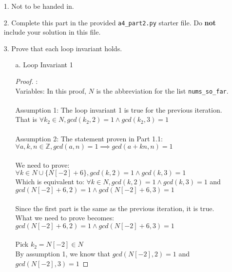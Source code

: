 \documentclass[fontsize=11pt]{article}
\newcommand{\Z}{\mathbb{Z}}
\begin{document}
\begin{enumerate}

\item[1.]
Not to be handed in.

\item[2.]
Complete this part in the provided \texttt{a4\_part2.py} starter file.
Do \textbf{not} include your solution in this file.

\item[3.]
Prove that each loop invariant holds.

\begin{enumerate}
\item[a.] Loop Invariant 1
\begin{proof} : \\
Variables: In this proof, $N$ is the abbreviation for the list \texttt{nums\_so\_far}. \\
\\
Assumption 1: The loop invariant 1 is true for the previous iteration. \\
That is $\forall k_2 \in N, gcd(k_2, 2) = 1 \land gcd(k_2, 3) = 1$ \\
\\
Assumption 2: The statement proven in Part 1.1: \\
$\forall a,k,n \in \Z, gcd(a,n) = 1 \implies gcd(a + kn, n) = 1$ \\
\\
We need to prove: $\forall k \in N \cup \{ N[-2] + 6 \}, gcd(k, 2) = 1 \land gcd(k, 3) = 1$ \\
Which is equivalent to: $\forall k \in N, gcd(k, 2) = 1 \land gcd(k, 3) = 1$ and \\ 
$gcd(N[-2] + 6, 2) = 1 \land gcd(N[-2] + 6, 3) = 1$ \\
\\ 
Since the first part is the same as the previous iteration, it is true. \\
What we need to prove becomes: 
$gcd(N[-2] + 6, 2) = 1 \land gcd(N[-2] + 6, 3) = 1$ \\
\\
Pick $k_2 = N[-2] \in N$ \\
By assumption 1, we know that $gcd(N[-2], 2) = 1$ and $gcd(N[-2], 3) = 1$


\end{proof}
\end{enumerate}
\end{enumerate}
\end{document}
